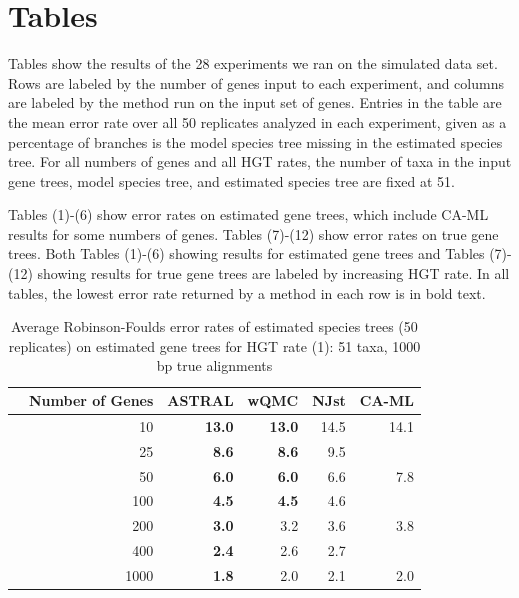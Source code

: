 \section{Tables}

Tables show the results of the 28 experiments we ran on the simulated data set. Rows are labeled by the number of genes input to each experiment, and columns are labeled by the method run on the input set of genes.  Entries in the table are the mean error rate over all 50 replicates analyzed in each experiment, given as a percentage of branches is the model species tree 
missing in the estimated species tree. 
For all numbers of genes and all HGT rates, the number of taxa in the input gene trees, model species tree, and estimated species tree are fixed at 51. 

Tables (1)-(6) show error rates on estimated gene trees, which include CA-ML results for some numbers of genes. Tables (7)-(12) show error rates on true gene trees.  Both Tables (1)-(6) showing results for estimated gene trees and Tables (7)-(12) showing results for true gene trees are labeled by increasing HGT rate. In all tables, the lowest error rate returned by a method in each row is in bold text.  



\begin{table}[h!]
\caption[error rates of estimated species trees (50 replicates)  on estimated gene trees for HGT rate 1]{Average Robinson-Foulds error rates of estimated species trees (50 replicates)  on estimated gene trees for HGT rate (1): 51 taxa, 1000 bp true alignments}
\begin{tabular}{rrrrrr}
 & Number of Genes & ASTRAL & wQMC  & NJst & CA-ML\\
\hline
 & 10 & \textbf{13.0} & \textbf{13.0} &   14.5 & 14.1 \\
 & 25 & \textbf{8.6} & \textbf{8.6} &   9.5 & \\
 & 50 & \textbf{6.0} & \textbf{6.0} &   6.6 & 7.8 \\
 & 100 & \textbf{4.5} & \textbf{4.5}   & 4.6 & \\
 & 200 & \textbf{3.0} & 3.2 &   3.6 & 3.8\\
 & 400 & \textbf{2.4} & 2.6 &   2.7 & \\
 & 1000 & \textbf{1.8} & 2.0   & 2.1 & 2.0 \\
\end{tabular}
\label{hgt::table1}
\end{table}


